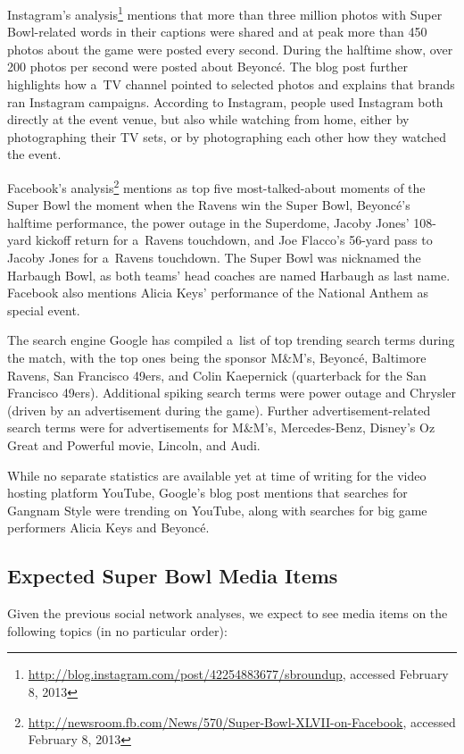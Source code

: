 Instagram's analysis\footnote{\url{http://blog.instagram.com/post/42254883677/sbroundup},
accessed February 8, 2013}
mentions that more than three million photos
with Super Bowl-related words in their captions were shared and
at peak more than 450 photos about the game were posted every second.
During the halftime show, over 200 photos per second were posted about Beyoncé.
The blog post further highlights how a~TV channel pointed to selected photos
and explains that brands ran Instagram campaigns.
According to Instagram, people used Instagram both directly at the event venue,
but also while watching from home, either by photographing their TV sets,
or by photographing each other how they watched the event.

Facebook's analysis\footnote{\url{http://newsroom.fb.com/News/570/Super-Bowl-XLVII-on-Facebook},
accessed February 8, 2013}
mentions as top five most-talked-about moments of the Super Bowl 
the moment when the Ravens win the Super Bowl, 
Beyoncé's halftime performance,
the power outage in the Superdome,
Jacoby Jones' 108-yard kickoff return for a~Ravens touchdown, and
Joe Flacco’s 56-yard pass to Jacoby Jones for a~Ravens touchdown.
The Super Bowl was nicknamed the Harbaugh Bowl, as both teams' head coaches
are named Harbaugh as last name.
Facebook also mentions Alicia Keys' performance of the National Anthem as special event.

The search engine Google has compiled a~list of top trending search terms
during the match, with the top ones being the sponsor M\&M's, Beyoncé, Baltimore Ravens,
San Francisco 49ers, and Colin Kaepernick (quarterback for the San Francisco 49ers).
Additional spiking search terms were power outage
and Chrysler (driven by an advertisement during the game).
Further advertisement-related search terms were for advertisements for M\&M's,
Mercedes-Benz, Disney’s Oz Great and Powerful movie, Lincoln, and Audi.

While no separate statistics are available yet at time of writing
for the video hosting platform YouTube,
Google's blog post mentions that searches for Gangnam Style were trending on YouTube,
along with searches for big game performers Alicia Keys and Beyoncé.

\subsection{Expected Super Bowl Media Items}

Given the previous social network analyses, we expect to see media items
on the following topics (in no particular order):

